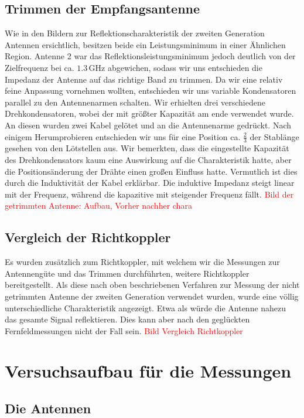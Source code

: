 \documentclass[titlepage,11pt,a4paper,ngerman]{article}
\begin{document}
\subsection{Trimmen der Empfangsantenne}
Wie in den Bildern zur Reflektionscharakteristik der zweiten Generation Antennen ersichtlich, besitzen beide ein Leistungsminimum in einer Ähnlichen Region. Antenne 2 war das Reflektionsleistungsminimum jedoch deutlich von der Zielfrequenz bei ca. $1.3\,$GHz abgewichen, sodass wir uns entschieden die Impedanz der Antenne auf das richtige Band zu trimmen. Da wir eine relativ feine Anpassung vornehmen wollten, entschieden wir uns variable Kondensatoren parallel zu den Antennenarmen schalten. Wir erhielten drei verschiedene Drehkondensatoren, wobei der mit größter Kapazität am ende verwendet wurde. An diesen wurden zwei Kabel gelötet und an die Antennenarme gedrückt. Nach einigem Herumprobieren entschieden wir uns für eine Position ca. $\frac{2}{3}$ der Stablänge gesehen von den Lötstellen aus. Wir bemerkten, dass die eingestellte Kapazität des Drehkondensators kaum eine Auswirkung auf die Charakteristik hatte, aber die Positionsänderung der Drähte einen großen Einfluss hatte. Vermutlich ist dies durch die Induktivität der Kabel erklärbar. Die induktive Impedanz steigt linear mit der Frequenz, während die kapazitive mit steigender Frequenz fällt. 
\textcolor{red}{Bild der getrimmten Antenne: Aufbau, Vorher nachher chara}

\subsection{Vergleich der Richtkoppler}
Es wurden zusätzlich zum Richtkoppler, mit welchem wir die Messungen zur Antennengüte und das Trimmen durchführten, weitere Richtkoppler bereitgestellt. Als diese nach oben beschriebenen Verfahren zur Messung der nicht getrimmten Antenne der zweiten Generation verwendet wurden, wurde eine völlig unterschiedliche Charakteristik angezeigt. Etwa als würde die Antenne nahezu das gesamte Signal reflektieren. Dies kann aber nach den geglückten Fernfeldmessungen nicht der Fall sein.
\textcolor{red}{Bild Vergleich Richtkoppler}

\section{Versuchsaufbau für die Messungen} 
\subsection{Die Antennen}
\end{document}
